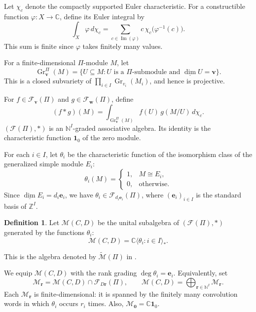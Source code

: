 \documentclass[12pt,reqno]{amsart}
\numberwithin{equation}{section}
\theoremstyle{definition}
\newtheorem{definition}[theorem]{Definition}
\theoremstyle{remark}
\renewcommand{\Im}{\operatorname{Im}}
\newcommand{\Gr}{\operatorname{Gr}}
\theoremstyle{plain}
\theoremstyle{plain}
\begin{document}
   Let $\chi_c$ denote the compactly supported Euler characteristic. For a constructible function $\varphi:X\to\mathbb C$, define its Euler integral by
   \[ \int_X \varphi\,d\chi_c
   =
   \sum_{c\in\Im(\varphi)} c\,\chi_c\bigl(\varphi^{-1}(c)\bigr).
   \]
   This sum is finite since $\varphi$ takes finitely many values.

   For a finite-dimensional $\Pi$-module $M$, let
   \[
   \Gr_{\mathbf v}^{\Pi}(M)
   =
   \{U\subseteq M: U \text{ is a }\Pi\text{-submodule and }
  \underline{\dim}U=\mathbf v\}.
   \]
   This is a closed subvariety of $\prod_{i\in I}\Gr_{v_i}(M_i)$, and hence is projective.

   For $f\in\mathcal F_{\mathbf v}(\Pi)$ and $g\in\mathcal F_{\mathbf w}(\Pi)$, define
   \begin{equation}\label{eq:Pi-convolution}
   (f*g)(M)
   =
   \int_{\Gr_{\mathbf v}^{\Pi}(M)} f(U)\,g(M/U)\,d\chi_c.
   \end{equation}
   $(\mathcal F(\Pi),*)$ is an $\mathbb N^I$-graded associative algebra. Its identity is the characteristic function $\mathbf 1_0$ of the zero module.
   
   For each $i\in I$, let $\theta_i$ be the characteristic function of the isomorphism class of the generalized simple module $E_i$:
   \[
   \theta_i(M)
   =
   \begin{cases}
   1,& M\cong E_i,\\
   0,& \text{otherwise}.
   \end{cases}
   \]
   Since $\underline{\dim}E_i=d_i\mathbf e_i$, we have $\theta_i\in\mathcal F_{d_i\mathbf e_i}(\Pi)$, where $(\mathbf e_i)_{i\in I}$ is the standard basis of $\mathbb Z^I$.

   \begin{definition}
   Let $\mathcal M(C,D)$ be the unital subalgebra of $(\mathcal F(\Pi),*)$ generated by the functions $\theta_i$:
   \[
   \mathcal M(C,D)
   =
   \mathbb C\langle\theta_i:i\in I\rangle_*.
   \]
   \end{definition}

   This is the algebra denoted by $\widetilde{\mathcal M}(\Pi)$ in \cite[Section~2.5]{GLS18}.

   We equip $\mathcal M(C,D)$ with the rank grading $\deg\theta_i=\mathbf e_i$. Equivalently, set
   \[
   \mathcal M_{\mathbf r}
   =
   \mathcal M(C,D)\cap\mathcal F_{D\mathbf r}(\Pi),
   \qquad
   \mathcal M(C,D)
   =
   \bigoplus_{\mathbf r\in\mathbb N^I}
   \mathcal M_{\mathbf r}.
   \]
   Each $\mathcal M_{\mathbf r}$ is finite-dimensional: it is spanned by the finitely many convolution words in which $\theta_i$ occurs $r_i$ times. Also, $\mathcal M_{\mathbf 0}=\mathbb C\mathbf 1_0$.
\end{document}
